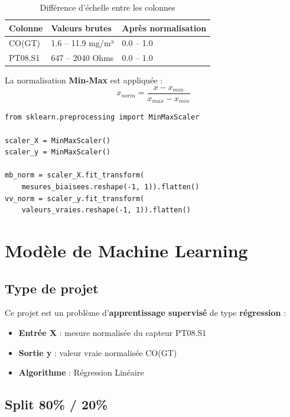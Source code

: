 \documentclass[12pt, a4paper]{article}
\begin{document}
\begin{table}[H]
    \centering
    \caption{Différence d'échelle entre les colonnes}
    \begin{tabular}{@{}lll@{}}
        \toprule
        \textbf{Colonne} & \textbf{Valeurs brutes} & \textbf{Après normalisation} \\
        \midrule
        CO(GT) & 1.6 -- 11.9 mg/m³ & 0.0 -- 1.0 \\
        PT08.S1 & 647 -- 2040 Ohms & 0.0 -- 1.0 \\
        \bottomrule
    \end{tabular}
\end{table}

La normalisation \textbf{Min-Max} est appliquée :
\begin{equation}
    x_{norm} = \frac{x - x_{min}}{x_{max} - x_{min}}
\end{equation}

\begin{lstlisting}[style=python, caption=Normalisation Min-Max]
from sklearn.preprocessing import MinMaxScaler

scaler_X = MinMaxScaler()
scaler_y = MinMaxScaler()

mb_norm = scaler_X.fit_transform(
    mesures_biaisees.reshape(-1, 1)).flatten()
vv_norm = scaler_y.fit_transform(
    valeurs_vraies.reshape(-1, 1)).flatten()
\end{lstlisting}

\section{Modèle de Machine Learning}

\subsection{Type de projet}
Ce projet est un problème d'\textbf{apprentissage supervisé} de type \textbf{régression} :

\begin{itemize}
    \item \textbf{Entrée X} : mesure normalisée du capteur PT08.S1
    \item \textbf{Sortie y} : valeur vraie normalisée CO(GT)
    \item \textbf{Algorithme} : Régression Linéaire
\end{itemize}

\subsection{Split 80\% / 20\%}
\end{document}
